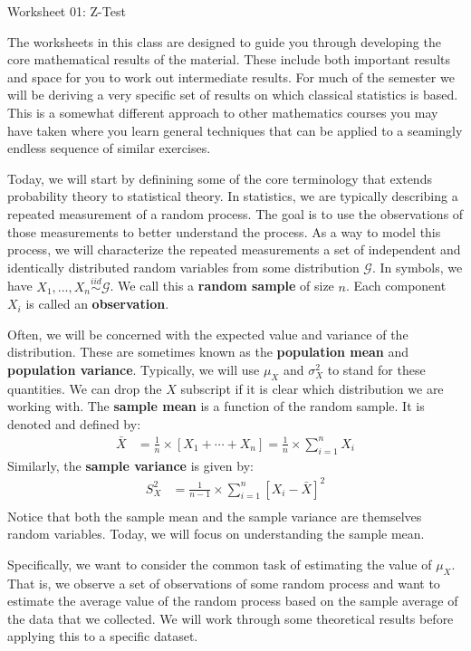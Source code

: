 \documentclass[12pt]{article}
\newcommand{\iid}{\stackrel{iid}{\sim}}
\begin{document}
{\large Worksheet 01: Z-Test}

\vspace*{18pt}

The worksheets in this class are designed to guide you through
developing the core mathematical results of the material. These
include both important results and space for you to work out intermediate
results. For much of the semester we will be deriving a very specific set of
results on which classical statistics is based. This is a somewhat
different approach to other mathematics courses you may have taken
where you learn general techniques that can be applied to a
seamingly endless sequence of similar exercises.  

Today, we will start by definining some of the core terminology
that extends probability theory to statistical theory. In statistics,
we are typically describing a repeated measurement of a random
process. The goal is to use the observations of those measurements to
better understand the process. As a way to model this process, we 
will characterize the repeated measurements a set of independent and
identically distributed random variables from some distribution
$\mathcal{G}$. In symbols, we have $X_1, \ldots, X_n \iid \mathcal{G}$.
We call this a \textbf{random sample} of size $n$. Each component $X_i$
is called an \textbf{observation}.

Often, we will be concerned with the expected value and variance of
the distribution. These are sometimes known as the \textbf{population mean}
and \textbf{population variance}. Typically, we will use $\mu_X$ and
$\sigma^2_X$ to stand for these quantities. We can drop the $X$ subscript
if it is clear which distribution we are working with. The \textbf{sample mean}
is a function of the random sample. It is denoted and defined by:
\begin{align*}
\bar{X} &= \frac{1}{n} \times \left[X_1 + \cdots + X_n \right] = \frac{1}{n} \times \sum_{i=1}^n X_i
\end{align*}
Similarly, the \textbf{sample variance} is given by:
\begin{align*}
S^2_X &= \frac{1}{n - 1} \times \sum_{i=1}^n \left[ X_i - \bar{X} \right]^{2} \\
\end{align*}
Notice that both the sample mean and the sample variance are themselves random
variables. Today, we will focus on understanding the sample mean.

Specifically, we want to consider the common task of estimating the value of
$\mu_X$. That is, we observe a set of observations of some random process and
want to estimate the average value of the random process based on the sample
average of the data that we collected. We will work through some theoretical
results before applying this to a specific dataset.
\end{document}
